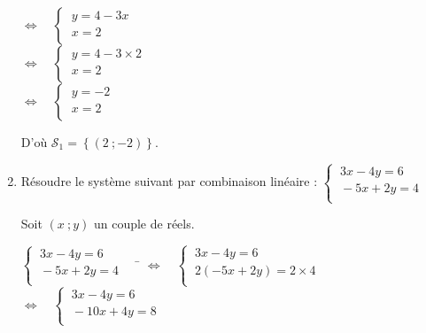 \documentclass[a4paper,11pt,exos]{nsi}
\begin{document}
\begin{enumerate}
\begin{tabbing}
                \>  $\iff \quad \left\{
                    \begin{array}{l}
                    \ y=4-3x \\
                    \ x=2 \\
                \end{array} \right.$\\[1em]
        
                \>  $\iff \quad \left\{
                    \begin{array}{l}
                    \ y=4-3\times 2 \\
                    \ x=2 \\
                \end{array} \right.$\\[1em]
        
                \>  $\iff \quad \left\{
                    \begin{array}{l}
                    \ y=-2 \\
                    \ x=2 \\
                \end{array} \right.$
            \end{tabbing}
        D'où $\mathcal{S}_1=\left\{(2\ ;-2)\right\}$.

        \item \textcolor{UGLiBlue}{Résoudre le système suivant par combinaison linéaire : $\left\{
			\begin{array}{l}
				\ 3x-4y=6 \\
				\ -5x+2y=4 \\
			\end{array} \right.$}

    Soit $(x\ ;y)$ un couple de réels.
    \begin{tabbing}
        $\left\{
            \begin{array}{l}
            \ 3x-4y=6 \\
			\ -5x+2y=4 \\
        \end{array} \right. \quad$
        \= $\iff \quad \left\{
            \begin{array}{l}
            \ 3x-4y=6 \\
            \ 2(-5x+2y)=2\times 4 \\
        \end{array} \right.$\\[1em]
        
        \>  $\iff \quad \left\{
            \begin{array}{l}
            \ 3x-4y=6 \\
            \ -10x+4y=8 \\
        \end{array} \right.$\\[1em]


\end{tabbing}
\end{enumerate}
\end{document}

